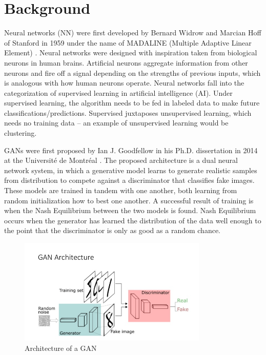 \documentclass[12pt,
 reprint,
nofootinbib,
 amsmath,amssymb,
 aps,
floatfix,
]{revtex4-2}
\begin{document}

\section{\label{sec:background}Background}



Neural networks (NN) were first developed by Bernard Widrow and Marcian Hoff of Stanford in 1959 under the name of MADALINE (Multiple Adaptive Linear Element) \cite{widrow1962generalization}. 
Neural networks were designed with inspiration taken from biological neurons in human brains.
Artificial neurons aggregate information from other neurons and fire off a signal depending on the strengths of previous inputs, which is analogous with how human neurons operate.
Neural networks fall into the categorization of supervised learning in artificial intelligence (AI).
Under supervised learning, the algorithm needs to be fed in labeled data to make future classifications/predictions.
Supervised juxtaposes unsupervised learning, which needs no training data -- an example of unsupervised learning would be clustering.


GANs were first proposed by Ian J. Goodfellow in his Ph.D. dissertation in 2014 at the Université de Montréal \cite{goodfellow2014generative}.
The proposed architecture is a dual neural network system, in which a generative model learns to generate realistic samples from distribution to compete against a discriminator that classifies fake images. 
These models are trained in tandem with one another, both learning from random initialization how to best one another.
A successful result of training is when the Nash Equilibrium between the two models is found.
Nash Equilibrium occurs when the generator has learned the distribution of the data well enough to the point that the discriminator is only as good as a random chance.

\begin{figure}[h!]
    \centering
    \includegraphics[width=9cm]{gan-arch.jpg}
    \caption{Architecture of a GAN}
    \label{fig:gan}
\end{figure}
\end{document}
